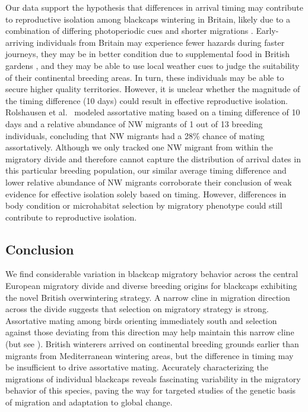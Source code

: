 \documentclass[a4paper, twoside]{templates/ociamthesis}
\begin{document}
Our data support the hypothesis that differences in arrival timing may contribute to reproductive isolation among blackcaps wintering in Britain, likely due to a combination of differing photoperiodic cues and shorter migrations \autocite{terrillEcophysiologicalAspectsRapid1990}.
Early-arriving individuals from Britain may experience fewer hazards during faster journeys, they may be in better condition due to supplemental food in British gardens \autocite{bearhopAssortativeMatingMechanism2005,plummerSupplementaryFeedingGardens2015}, and they may be able to use local weather cues to judge the suitability of their continental breeding areas.
In turn, these individuals may be able to secure higher quality territories.
However, it is unclear whether the magnitude of the timing difference (10 days) could result in effective reproductive isolation.
Rolshausen et al.~\autocite{rolshausenSpringArrivalMigratory2010} modeled assortative mating based on a timing difference of 10 days and a relative abundance of NW migrants of 1 out of 13 breeding individuals, concluding that NW migrants had a 28\% chance of mating assortatively.
Although we only tracked one NW migrant from within the migratory divide and therefore cannot capture the distribution of arrival dates in this particular breeding population, our similar average timing difference and lower relative abundance of NW migrants corroborate their conclusion of weak evidence for effective isolation solely based on timing.
However, differences in body condition or microhabitat selection by migratory phenotype \autocite{rolshausenSpringArrivalMigratory2010} could still contribute to reproductive isolation.

\hypertarget{conclusion}{%
\subsection{Conclusion}\label{conclusion}}

We find considerable variation in blackcap migratory behavior across the central European migratory divide and diverse breeding origins for blackcaps exhibiting the novel British overwintering strategy. A narrow cline in migration direction across the divide suggests that selection on migratory strategy is strong. Assortative mating among birds orienting immediately south and selection against those deviating from this direction may help maintain this narrow cline (but see \autocite{irwinAssortativeMatingHybrid2020}). British winterers arrived on continental breeding grounds earlier than migrants from Mediterranean wintering areas, but the difference in timing may be insufficient to drive assortative mating. Accurately characterizing the migrations of individual blackcaps reveals fascinating variability in the migratory behavior of this species, paving the way for targeted studies of the genetic basis of migration and adaptation to global change.
\end{document}
